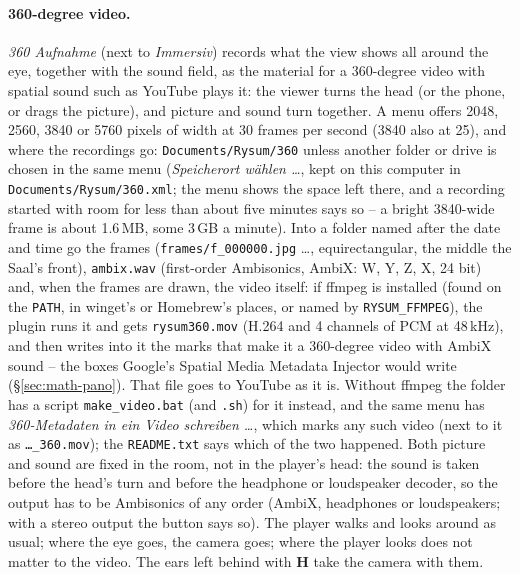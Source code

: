 \documentclass[11pt,a4paper,parskip=half,DIV=11,toc=bibliography]{scrartcl}
\newcommand{\ui}[1]{\emph{#1}}                 %
\newcommand{\fn}[1]{\mbox{\texttt{#1}}}
\begin{document}
\paragraph{360-degree video.} \ui{360\textdegree{} Aufnahme} (next to \ui{Immersiv}) records what the view shows all around the eye,
together with the sound field, as the material for a 360-degree video with spatial sound such as YouTube plays it: the viewer turns the head
(or the phone, or drags the picture), and picture and sound turn together. A menu offers 2048, 2560, 3840 or 5760 pixels of width at 30 frames
per second (3840 also at 25), and where the recordings go: \fn{Documents/Rysum/360} unless another folder or drive is chosen in the same
menu (\ui{Speicherort wählen \dots}, kept on this computer in \fn{Documents/Rysum/360.xml}; the menu shows the space left there, and a recording
started with room for less than about five minutes says so -- a bright 3840-wide frame is about 1.6\,MB, some 3\,GB a minute). Into a folder
named after the date and time go the frames (\fn{frames/f\_000000.jpg} \dots, equirectangular,
the middle the Saal's front), \fn{ambix.wav} (first-order Ambisonics, AmbiX: W, Y, Z, X, 24 bit) and, when the frames are drawn, the video
itself: if ffmpeg is installed (found on the \texttt{PATH}, in winget's or Homebrew's places, or named by \texttt{RYSUM\_FFMPEG}), the plugin runs
it and gets \fn{rysum360.mov} (H.264 and 4 channels of PCM at 48\,kHz), and then writes into it the marks that make it a 360-degree video with
AmbiX sound -- the boxes Google's Spatial Media Metadata Injector would write (\S\ref{sec:math-pano}). That file goes to YouTube as it is.
Without ffmpeg the folder has a script \fn{make\_video.bat} (and \fn{.sh}) for it instead, and the same menu has
\ui{360\textdegree-Metadaten in ein Video schreiben \dots}, which marks any such video (next to it as \fn{\dots\_360.mov}); the
\fn{README.txt} says which of the two happened. Both picture and
sound are fixed in the room, not in the player's head: the sound is taken before the head's turn and before the headphone or loudspeaker
decoder, so the output has to be Ambisonics of any order (AmbiX, headphones or loudspeakers; with a stereo output the button says so). The
player walks and looks around as usual; where the eye goes, the camera goes; where the player looks does not matter to the video. The ears
left behind with \textbf{H} take the camera with them.
\end{document}
